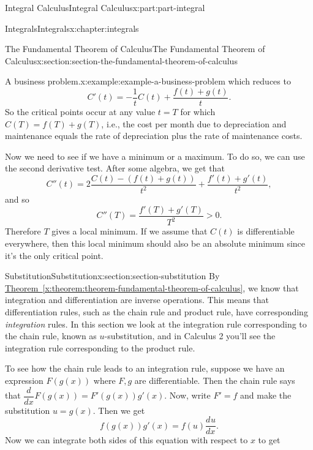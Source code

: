 \documentclass[twoside,10pt,]{tufte-book}
\newcommand{\xreffont}{\relax}
\numberwithin{equation}{part}
\newcommand{\dv}[3][]{\dfrac{d^{#1} #2}{d #3^{#1}}}
\begin{document}
\begin{partptx}{Integral Calculus}{}{Integral Calculus}{}{}{x:part:part-integral}
\begin{chapterptx}{Integrals}{}{Integrals}{}{}{x:chapter:integrals}
\begin{sectionptx}{The Fundamental Theorem of Calculus}{}{The Fundamental Theorem of Calculus}{}{}{x:section:section-the-fundamental-theorem-of-calculus}
\begin{example}{A business problem.}{x:example:example-a-business-problem}
which reduces to%
\begin{equation*}
C'(t) = -\frac{1}{t}C(t) + \frac{f(t) + g(t)}{t}.
\end{equation*}
So the critical points occur at any value \(t = T\) for which \(C(T) = f(T) + g(T)\), i.e., the cost per month due to depreciation and maintenance equals the rate of depreciation plus the rate of maintenance costs.%
\par
Now we need to see if we have a minimum or a maximum. To do so, we can use the second derivative test. After some algebra, we get that%
\begin{equation*}
C''(t) = 2\frac{C(t) - (f(t) + g(t))}{t^{2}} + \frac{f'(t) + g'(t)}{t^{2}},
\end{equation*}
and so%
\begin{equation*}
C''(T) = \frac{f'(T) + g'(T)}{T^{2}} >0.
\end{equation*}
Therefore \(T\) gives a local minimum. If we assume that \(C(t)\) is differentiable everywhere, then this local minimum should also be an absolute minimum since it's the only critical point.%
\end{example}
\end{sectionptx}
%
%
\typeout{************************************************}
\typeout{************************************************}
%
\begin{sectionptx}{Substitution}{}{Substitution}{}{}{x:section:section-substitution}
By \hyperref[x:theorem:theorem-fundamental-theorem-of-calculus]{Theorem~{\xreffont\ref{x:theorem:theorem-fundamental-theorem-of-calculus}}}, we know that integration and differentiation are inverse operations. This means that differentiation rules, such as the chain rule and product rule, have corresponding \emph{integration} rules. In this section we look at the integration rule corresponding to the chain rule, known as \(u\)-substitution, and in Calculus 2 you'll see the integration rule corresponding to the product rule.%
\par
To see how the chain rule leads to an integration rule, suppose we have an expression \(F(g(x))\) where \(F,g\) are differentiable. Then the chain rule says that \(\dv{}{x}F(g(x)) = F'(g(x))g'(x).\) Now, write \(F' = f\) and make the substitution \(u = g(x)\). Then we get%
\begin{equation*}
f(g(x))g'(x) = f(u)\dv{u}{x}.
\end{equation*}
Now we can integrate both sides of this equation with respect to \(x\) to get%
\begin{equation*}

\end{equation*}
\end{sectionptx}
\end{chapterptx}
\end{partptx}
\end{document}
